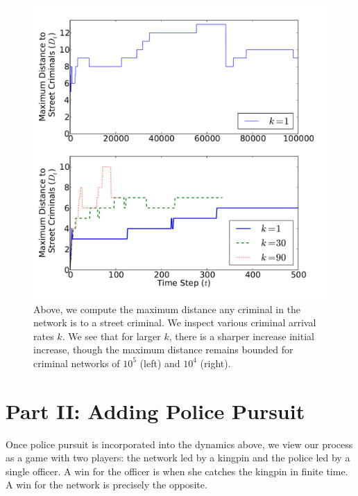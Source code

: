 \documentclass[%
 reprint,
 amsmath,amssymb,
 aps,
]{revtex4-1}
\theoremstyle{plain}
\theoremstyle{definition}
\begin{document}
\begin{figure}\centering
\includegraphics[width =  .5\textwidth]{LeafWatcher.pdf}
\caption{Above, we compute the maximum distance any criminal in the network is to a street criminal.  We inspect various criminal arrival rates $k$.  We see that for larger $k$, there is a sharper increase initial increase, though the maximum distance remains bounded for criminal networks of $10^5$ (left) and $10^4$ (right).}
\label{lw}
\end{figure}
\section*{Part II: Adding Police Pursuit}

Once police pursuit is incorporated into the dynamics above, we view our process as a game with two players: the network led by a kingpin and the police led by a single officer.  A win for the officer is when she catches the kingpin in finite time.  A win for the network is precisely the opposite.
\end{document}
